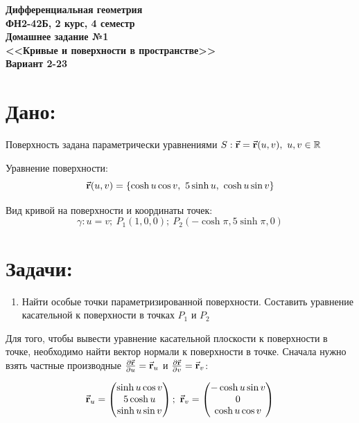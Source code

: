 \documentclass[12pt,a4paper]{article}
\begin{document}
    \begin{center}
        {\textbf 
            {\Large
                Дифференциальная геометрия
                \\[2mm]
                ФН2-42Б, 2 курс, 4 семестр
                \\[10mm]
                Домашнее задание №1
                \\[2mm]
                <<Кривые и поверхности в пространстве>>
                \\[2mm]
                Вариант 2-23
            }
        }
    \end{center}

    \section*{Дано: }

    \hspace{5mm} Поверхность задана параметрически уравнениями $ S: \vec{\textbf r} = \vec{\textbf r}(u, v), \  u, v \in \mathbb{R} $

    Уравнение поверхности: 
    \[ \vec{\textbf r}(u, v) = \{ \cosh u \cos v,\ 5 \sinh u,\ \cosh u \sin v \} \]

    Вид кривой на поверхности и координаты точек: 
    \[ \gamma: u = v;\ P_1(1, 0, 0);\ P_2(-\cosh \pi, 5 \sinh \pi, 0) \]

    \section*{Задачи: }


    \begin{enumerate}
        \item Найти особые точки параметризированной поверхности. Составить уравнение касательной к поверхности в точках $ P_1 $ и $ P_2 $
    \end{enumerate}

    Для того, чтобы вывести уравнение касательной плоскости к поверхности в точке, необходимо найти вектор нормали к поверхности в точке. Сначала нужно взять частные производные $ \frac{\partial \vec{\textbf r}}{\partial u} = \vec{\textbf r}_u $ и $ \frac{\partial \vec{\textbf r}}{\partial v} = \vec{\textbf r}_v $: 

    \[
        \vec{\textbf r}_u = 
            \begin{pmatrix}
                \sinh u \cos v
                \\
                5\cosh u
                \\
                \sinh u \sin v
            \end{pmatrix};\  
        \vec{\textbf r}_v = 
            \begin{pmatrix}
                -\cosh u \sin v
                \\
                0
                \\
                \cosh u \cos v
            \end{pmatrix}
    \]
\end{document}
